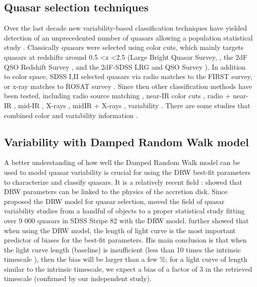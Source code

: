 \documentclass[modern]{aastex62}
\begin{document}
\subsection{Quasar selection techniques}
Over the last decade new variability-based classification techniques have yielded detection of an unprecedented number of quasars allowing a population statistical study \citep{fan2001, richards2006, kozlowski2010, palanque2011, macleod2011, graham2014, alsayyad2016, ruan2017}. Classically quasars were selected using color cuts,  which mainly targets quasars at redshifts around 0.5 \textless  z \textless 2.5 (Large Bright Quasar Survey, \cite{hewett1995}, the 2dF QSO Redshift Survey \cite{croom2004}, and the 2dF-SDSS LRG and QSO Survey \cite{croom2009}).  In addition to color space, SDSS I,II selected quasars via radio matches to the FIRST survey, or x-ray matches to ROSAT survey \citep{myers2015}. Since then other classification methods have been tested, including radio source matching \citep{mcgreer2009}, near-IR color cuts \citep{banerji2012},  radio + near-IR \citep{glikman2012}, mid-IR \citep{stern2005, richards2009a, stern2012}, X-rays \citep{trichas2012},  midIR + X-rays \citep{lacy2004, hickox2007, hickox2009}, variability \citep{schmidt2010, butler2011, macleod2011, palanque2011,palanque2016}. There are some studies that combined color and variability information \citep{tie2017, peters2015, sesar2007}. 

\subsection{Variability with Damped Random Walk model}
A better understanding of how well the Damped Random Walk model can be used to model quasar variability is crucial for using the DRW best-fit parameters to characterize and classify quasars. It is a relatively recent field : \cite{kelly2009} showed that DRW parameters can be linked to the physics of the accretion disk. Since \cite{kozlowski2010} proposed the DRW model for quasar selection, \cite{macleod2010} moved the field of quasar variability studies from a handful of objects to a proper statistical study fitting over 9 000 quasars in SDSS Stripe 82 with the DRW model.  \cite{kozlowski2017a} further showed that when using the DRW model, the length of light curve is the most important predictor of biases for the best-fit parameters. His main conclusion is that when the light curve length (baseline) is insufficient (less than 10 times the intrinsic timescale ), then the bias will be larger than a few \%; for a light curve of length similar to the intrinsic timescale, we expect a bias of a factor of 3 in the retrieved timescale (confirmed by our independent study). 
\end{document}
